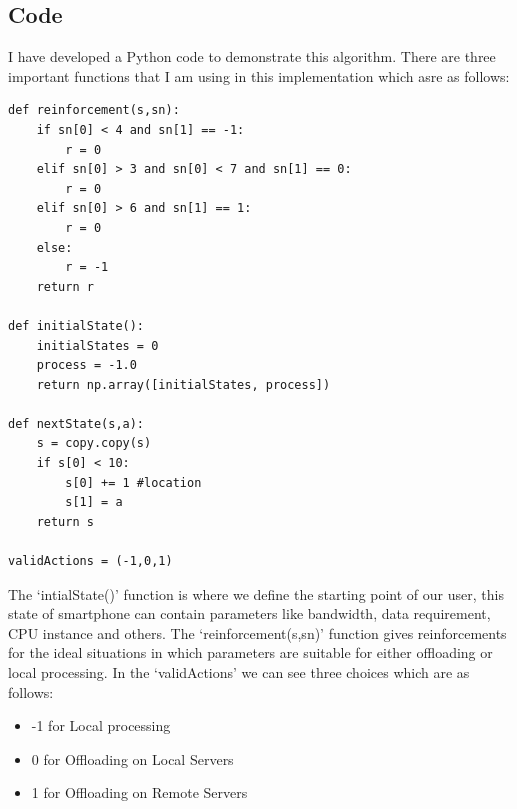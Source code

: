 \documentclass{article}
\begin{document}
\subsection{Code}
I have developed a Python code to demonstrate this algorithm. There are three important functions that I am using in this implementation which asre as follows:
\begin{small}
\begin{lstlisting}
def reinforcement(s,sn):
    if sn[0] < 4 and sn[1] == -1:
        r = 0
    elif sn[0] > 3 and sn[0] < 7 and sn[1] == 0:
        r = 0
    elif sn[0] > 6 and sn[1] == 1:
        r = 0
    else:
        r = -1  
    return r       

def initialState():
    initialStates = 0
    process = -1.0
    return np.array([initialStates, process])

def nextState(s,a):
    s = copy.copy(s)
    if s[0] < 10:
        s[0] += 1 #location
        s[1] = a
    return s

validActions = (-1,0,1)
\end{lstlisting}
\end{small}

The `intialState()' function is where we define the starting point of our user, this state of smartphone can contain parameters like bandwidth, data requirement, CPU instance and others. The `reinforcement(s,sn)' function gives reinforcements for the ideal situations in which parameters are suitable for either offloading or local processing.
In the `validActions' we can see three choices which are as follows:
\begin{itemize}
   \item -1 for Local processing
   \item 0 for Offloading on Local Servers
   \item 1 for Offloading on Remote Servers
\end{itemize}      
\end{document}
